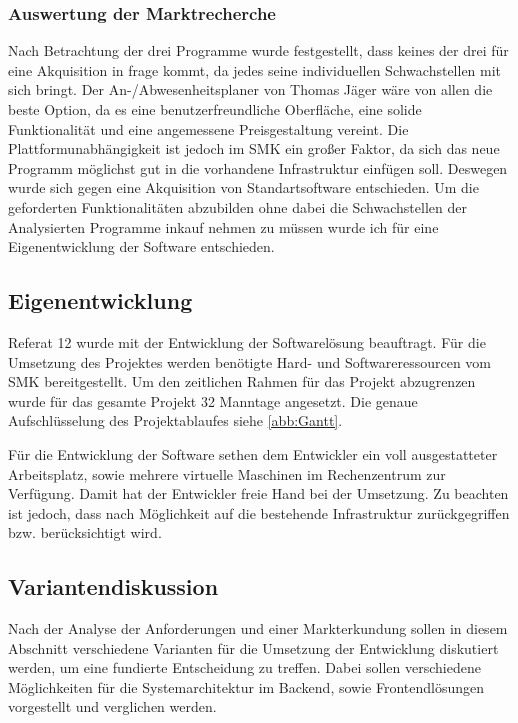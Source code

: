 \subsubsection{Auswertung der Marktrecherche}
\label{sec:AuswertungMarktrecherche}
Nach Betrachtung der drei Programme wurde festgestellt, dass keines der drei für eine Akquisition in frage kommt, da jedes seine individuellen Schwachstellen mit sich bringt. Der An-/Abwesenheitsplaner von Thomas Jäger wäre von allen die beste Option, da es eine benutzerfreundliche Oberfläche, eine solide Funktionalität und eine angemessene Preisgestaltung vereint. Die Plattformunabhängigkeit ist jedoch im SMK ein großer Faktor, da sich das neue Programm möglichst gut in die vorhandene Infrastruktur einfügen soll. Deswegen wurde sich gegen eine Akquisition von Standartsoftware entschieden. Um die geforderten Funktionalitäten abzubilden ohne dabei die Schwachstellen der Analysierten Programme inkauf nehmen zu müssen wurde ich für eine Eigenentwicklung der Software entschieden.

\subsection{Eigenentwicklung}
\label{sec:Eigenentwicklung}
Referat 12 wurde mit der Entwicklung der Softwarelösung beauftragt. Für die Umsetzung des Projektes werden benötigte Hard- und Softwareressourcen vom SMK bereitgestellt. Um den zeitlichen Rahmen für das Projekt abzugrenzen wurde für das gesamte Projekt 32 Manntage angesetzt. Die genaue Aufschlüsselung des Projektablaufes siehe \ref{abb:Gantt}.

Für die Entwicklung der Software sethen dem Entwickler ein voll ausgestatteter Arbeitsplatz, sowie mehrere virtuelle Maschinen im Rechenzentrum zur Verfügung. Damit hat der Entwickler freie Hand bei der Umsetzung. Zu beachten ist jedoch, dass nach Möglichkeit auf die bestehende Infrastruktur zurückgegriffen bzw. berücksichtigt wird.


\subsection{Variantendiskussion}
\label{sec:Marktrecherche}
Nach der Analyse der Anforderungen und einer Markterkundung sollen in diesem Abschnitt verschiedene Varianten für die Umsetzung der Entwicklung diskutiert werden, um eine fundierte Entscheidung zu treffen. Dabei sollen verschiedene Möglichkeiten für die Systemarchitektur im Backend, sowie Frontendlösungen vorgestellt und verglichen werden.

